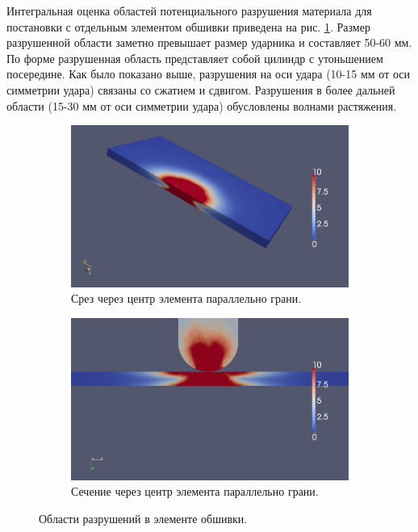 Интегральная оценка областей потенциального разрушения материала для постановки с отдельным элементом обшивки приведена на рис. \ref{pic:pkm_experiment_wing_only_result}. Размер разрушенной области заметно превышает размер ударника и составляет 50-60 мм. По форме разрушенная область представляет собой цилиндр с утоньшением посередине. Как было показано выше, разрушения на оси удара (10-15 мм от оси симметрии удара) связаны со сжатием и сдвигом. Разрушения в более дальней области (15-30 мм от оси симметрии удара) обусловлены волнами растяжения.


\begin{figure}[htp]
\begin{subfigure}[b]{\textwidth}
\centering
\includegraphics[width=\textwidth]{png/pkm-experiment/wing-only/sum-3d.png}
\caption{Срез через центр элемента параллельно грани.}
\end{subfigure}
\begin{subfigure}[b]{\textwidth}
\centering
\includegraphics[width=\textwidth]{png/pkm-experiment/wing-only/sum.png}
\caption{Сечение через центр элемента параллельно грани.}
\end{subfigure}
\caption{Области разрушений в элементе обшивки.}
\label{pic:pkm_experiment_wing_only_result}
\end{figure}

